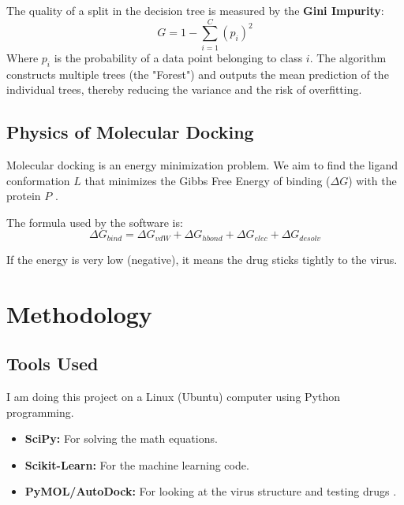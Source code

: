 \documentclass[12pt, a4paper]{article}
\begin{document}
The quality of a split in the decision tree is measured by the \textbf{Gini Impurity}:
\begin{equation}
    G = 1 - \sum_{i=1}^{C} (p_i)^2
\end{equation}
Where $p_i$ is the probability of a data point belonging to class $i$. The algorithm constructs multiple trees (the "Forest") and outputs the mean prediction of the individual trees, thereby reducing the variance and the risk of overfitting.

\subsection{Physics of Molecular Docking}
Molecular docking is an energy minimization problem. We aim to find the ligand conformation $L$ that minimizes the Gibbs Free Energy of binding ($\Delta G$) with the protein $P$ \cite{ref6}.

The formula used by the software is:
\begin{equation}
    \Delta G_{bind} = \Delta G_{vdW} + \Delta G_{hbond} + \Delta G_{elec} + \Delta G_{desolv}
\end{equation}

If the energy is very low (negative), it means the drug sticks tightly to the virus.

\newpage

\section{Methodology}

\subsection{Tools Used}
I am doing this project on a Linux (Ubuntu) computer using Python programming.
\begin{itemize}
    \item \textbf{SciPy:} For solving the math equations.
    \item \textbf{Scikit-Learn:} For the machine learning code.
    \item \textbf{PyMOL/AutoDock:} For looking at the virus structure and testing drugs \cite{ref6}.
\end{itemize}
\end{document}
